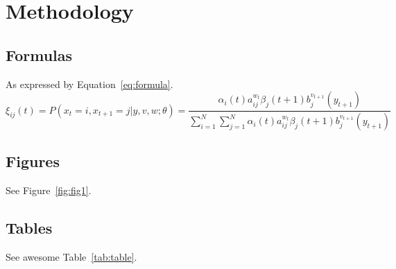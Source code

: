 \section{Methodology}\label{sec:method}

\subsection{Formulas}

As expressed by Equation~\ref{eq:formula}.
\begin{equation}
    \label{eq:formula}
    \xi _{ij}(t)=P(x_{t}=i,x_{t+1}=j|y,v,w;\theta)= {\frac {\alpha _{i}(t)a^{w_t}_{ij}\beta _{j}(t+1)b^{v_{t+1}}_{j}(y_{t+1})}{\sum _{i=1}^{N} \sum _{j=1}^{N} \alpha _{i}(t)a^{w_t}_{ij}\beta _{j}(t+1)b^{v_{t+1}}_{j}(y_{t+1})}}
\end{equation}

\subsection{Figures}

See Figure~\ref{fig:fig1}.

\subsection{Tables}

See awesome Table~\ref{tab:table}.
